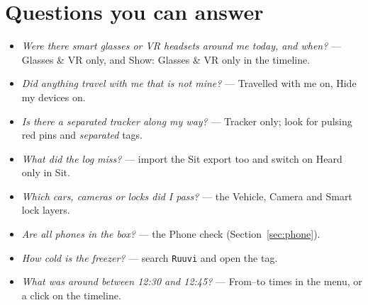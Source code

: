 \documentclass[10pt,a4paper]{article}
\newcommand{\ui}[1]{\textsf{\small #1}}            %
\begin{document}
\section{Questions you can answer}\label{sec:questions}
\begin{itemize}[leftmargin=1.2em]
\item \emph{Were there smart glasses or VR headsets around me today, and when?} --- \ui{Glasses \& VR} only, and \ui{Show: Glasses \& VR only} in the timeline.
\item \emph{Did anything travel with me that is not mine?} --- \ui{Travelled with me} on, \ui{Hide my devices} on.
\item \emph{Is there a separated tracker along my way?} --- \ui{Tracker} only; look for pulsing red pins and \emph{separated} tags.
\item \emph{What did the log miss?} --- import the Sit export too and switch on \ui{Heard only in Sit}.
\item \emph{Which cars, cameras or locks did I pass?} --- the \ui{Vehicle}, \ui{Camera} and \ui{Smart lock} layers.
\item \emph{Are all phones in the box?} --- the Phone check (Section~\ref{sec:phone}).
\item \emph{How cold is the freezer?} --- search \texttt{Ruuvi} and open the tag.
\item \emph{What was around between 12:30 and 12:45?} --- From--to times in the menu, or a click on the timeline.
\end{itemize}
\end{document}
